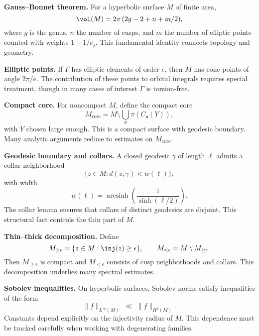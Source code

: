 \medskip

\noindent


\noindent\textbf{Gauss–Bonnet theorem.}
For a hyperbolic surface $M$ of finite area,
\[
  \vol(M) = 2\pi\,(2g-2 + n + m/2),
\]
where $g$ is the genus,
$n$ the number of cusps,
and $m$ the number of elliptic points counted with weights $1-1/e_{j}$.
This fundamental identity connects topology and geometry.

\medskip

\noindent\textbf{Elliptic points.}
If $\Gamma$ has elliptic elements of order $e$,
then $M$ has cone points of angle $2\pi/e$.
The contribution of these points to orbital integrals
requires special treatment,
though in many cases of interest $\Gamma$ is torsion-free.

\medskip

\noindent\textbf{Compact core.}
For noncompact $M$,
define the compact core
\[
  M_{\mathrm{core}} = M \setminus \bigcup_{\mathfrak{a}} \pi(C_{\mathfrak{a}}(Y)),
\]
with $Y$ chosen large enough.
This is a compact surface with geodesic boundary.
Many analytic arguments reduce to estimates on $M_{\mathrm{core}}$.

\medskip

\noindent\textbf{Geodesic boundary and collars.}
A closed geodesic $\gamma$ of length $\ell$ admits a collar neighborhood
\[
  \{ z\in M : d(z,\gamma)<w(\ell) \},
\]
with width
\[
  w(\ell) = \operatorname{arcsinh}\!\left(\frac{1}{\sinh(\ell/2)}\right).
\]
The collar lemma ensures that collars of distinct geodesics are disjoint.
This structural fact controls the thin part of $M$.

\medskip

\noindent\textbf{Thin–thick decomposition.}
Define
\[
  M_{\ge \epsilon} = \{ z\in M : \inj(z)\ge \epsilon \}, \qquad
  M_{<\epsilon} = M\setminus M_{\ge \epsilon}.
\]
Then $M_{\ge \epsilon}$ is compact
and $M_{<\epsilon}$ consists of cusp neighborhoods and collars.
This decomposition underlies many spectral estimates.

\medskip

\noindent\textbf{Sobolev inequalities.}
On hyperbolic surfaces,
Sobolev norms satisfy inequalities of the form
\[
  \|f\|_{L^{\infty}(M)} \;\ll\; \|f\|_{H^{2}(M)}.
\]
Constants depend explicitly on the injectivity radius of $M$.
This dependence must be tracked carefully when working with degenerating families.

